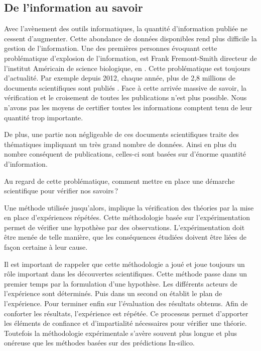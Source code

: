 \begin{refsegment}
\chapter*{De l'information au savoir}
Avec l’avènement des outils informatiques, la quantité d’information publiée ne cessent d’augmenter. Cette abondance de données disponibles rend plus difficile la gestion de l’information. Une des premières personnes évoquant cette problématique d’explosion de l’information, est Frank Fremont-Smith directeur de l’institut Américain de science biologique,  en \citeyear{fremont61}  \cite{fremont61}. Cette problématique est toujours d’actualité. Par exemple depuis 2012, chaque année, plus de 2,8 millions de documents scientifiques sont publiés  \cite{oecd2016} . Face à cette arrivée massive de savoir, la vérification et le croisement de toutes les publications n’est plus possible.  Nous n’avons pas les moyens de certifier toutes les informations comptent tenu de leur quantité trop importante.

De plus, une partie non négligeable de ces documents scientifiques traite des thématiques impliquant un très grand nombre de données. Ainsi en plus du nombre conséquent de publications, celles-ci sont basées sur d’énorme quantité d’information.

Au regard de cette problématique, comment mettre en place une démarche scientifique pour vérifier nos savoirs ?

Une méthode utilisée jusqu’alors, implique la vérification des théories par la mise en place d’expériences répétées. Cette méthodologie basée sur l’expérimentation permet de vérifier une hypothèse par des observations. L'expérimentation doit être menée de telle manière, que les conséquences étudiées doivent être liées de façon certaine à leur cause.

Il est important de rappeler que cette méthodologie a joué et joue toujours un rôle important dans les découvertes scientifiques. Cette méthode passe dans un premier temps par la formulation d’une hypothèse. Les différents acteurs de l’expérience sont déterminés. Puis dans un second on établit le plan de l’expérience. Pour terminer enfin sur l’évaluation des résultats obtenus. Afin de conforter les résultats, l’expérience est répétée. Ce processus permet d'apporter les éléments de confiance et d'impartialité nécessaires pour vérifier une théorie. Toutefois la méthodologie expérimentale s’avère souvent plus longue et plus onéreuse que les méthodes basées sur des prédictions In-silico. 


\end{refsegment}
